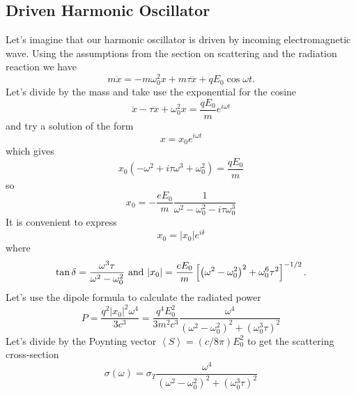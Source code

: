 \subsection{Driven Harmonic Oscillator}
\label{sec:driv-harm-oscill}

Let's imagine that our harmonic oscillator is driven by incoming
electromagnetic wave.  Using the assumptions from the section on
scattering and the radiation reaction we have
\begin{equation}
m \ddot{x} = -m\omega_0^2 x + m \tau \dddot{x} + q E_0 \cos \omega t.
\label{eq:254}
\end{equation}
Let's divide by the mass and take use the exponential for the cosine
\begin{equation}
\ddot{x} -\tau \dddot{x} + \omega_0^2 x = \frac{q E_0}{m} e^{i\omega t}
\label{eq:255}
\end{equation}
and try a solution of the form
\begin{equation}
x = x_0 e^{i\omega t}
\label{eq:256}
\end{equation}
which gives
\begin{equation}
x_0 \left ( -\omega^2 + i \tau \omega^3 + \omega_0^2 \right )= \frac{q E_0}{m} 
\label{eq:257}
\end{equation}
so 
\begin{equation}
x_0 = -\frac{e E_0}{m} \frac{1}{\omega^2-\omega_0^2 - i \tau \omega_0^3}
\label{eq:258}
\end{equation}
It is convenient to express 
\begin{equation}
x_0 = |x_0| e^{i\delta}
\label{eq:259}
\end{equation}
where
\begin{equation}
\tan \delta = \frac{\omega^3\tau}{\omega^2-\omega_0^2}~
\hbox{\rm and}~|x_0| = \frac{e E_0}{m} 
\left [ \left ( \omega^2-\omega_0^2 \right )^2 + \omega_0^6 \tau^2 \right ]^{-1/2}.
\label{eq:260}
\end{equation}
Let's use the dipole formula to calculate the radiated power
\begin{equation}
P = \frac{q^2 |x_0|^2 \omega^4}{3 c^3} = \frac{q^4 E_0^2}{3m^2 c^3}
\frac{\omega^4}{\left (\omega^2-\omega_0^2\right )^2+\left(\omega_0^3 \tau\right)^2}
\label{eq:261}
\end{equation}
Let's divide by the Poynting vector $\left \langle S \right \rangle =
(c/8\pi) E_0^2$
to get the scattering cross-section
\begin{equation}
\sigma(\omega) = \sigma_T \frac{\omega^4}{\left
  (\omega^2-\omega_0^2\right )^2+\left(\omega_0^3 \tau\right)^2}
\label{eq:262}
\end{equation}
